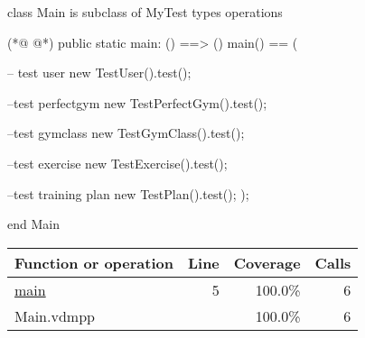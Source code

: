\begin{vdmpp}[breaklines=true]
class Main is subclass of MyTest
types
operations

(*@
\label{main:5}
@*)
 public static main: () ==> ()
 main() == (
   
    -- test user
   new TestUser().test();
   
   --test perfectgym
   new TestPerfectGym().test();
   
   --test gymclass
   new TestGymClass().test();
   
   --test exercise
   new TestExercise().test();
   
   --test training plan
   new TestPlan().test();
 );

 
end Main
\end{vdmpp}
\bigskip
\begin{longtable}{|l|r|r|r|}
\hline
Function or operation & Line & Coverage & Calls \\
\hline
\hline
\hyperref[main:5]{main} & 5&100.0\% & 6 \\
\hline
\hline
Main.vdmpp & & 100.0\% & 6 \\
\hline
\end{longtable}

